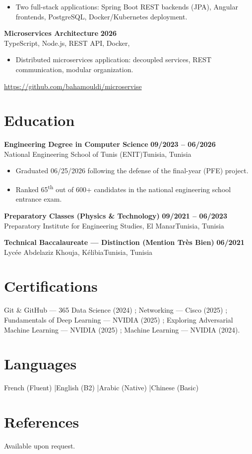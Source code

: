 \documentclass[a4paper,10pt]{article}
\newcommand{\cventry}[4]{\textbf{#1} \hfill \textbf{#4}\\[1pt]#2{\ifx\relax#3\relax\else, #3\fi}\par\vspace{2pt}}
\newcommand{\repolink}[1]{{\small\href{#1}{#1}}\par\vspace{1pt}}
\begin{document}
\begin{itemize}
  \item Two full-stack applications: Spring Boot REST backends (JPA), Angular frontends, PostgreSQL, Docker/Kubernetes deployment.
\end{itemize}
\cventry{Microservices Architecture}{TypeScript, Node.js, REST API, Docker}{}{2026}
\begin{itemize}
  \item Distributed microservices application: decoupled services, REST communication, modular organization.
\end{itemize}
\repolink{https://github.com/bahamouldi/microservise}

\section{Education}
\cventry{Engineering Degree in Computer Science}{National Engineering School of Tunis (ENIT)}{Tunisia}{09/2023 -- 06/2026}
\begin{itemize}
  \item Graduated 06/25/2026 following the defense of the final-year (PFE) project.
  \item Ranked 65\textsuperscript{th} out of 600+ candidates in the national engineering school entrance exam.
\end{itemize}
\cventry{Preparatory Classes (Physics \& Technology)}{Preparatory Institute for Engineering Studies, El Manar}{Tunisia}{09/2021 -- 06/2023}
\cventry{Technical Baccalaureate --- Distinction (Mention Tr\`es Bien)}{Lyc\'ee Abdelaziz Khouja, K\'elibia}{Tunisia}{06/2021}

\section{Certifications}
Git \& GitHub --- 365 Data Science (2024) ; Networking --- Cisco (2025) ; Fundamentals of Deep Learning --- NVIDIA (2025) ; Exploring Adversarial Machine Learning --- NVIDIA (2025) ; Machine Learning --- NVIDIA (2024).

\section{Languages}
French (Fluent) \quad|\quad English (B2) \quad|\quad Arabic (Native) \quad|\quad Chinese (Basic)

\section{References}
Available upon request.
\end{document}
